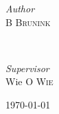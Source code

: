 \documentclass[11pt]{book}
\begin{document}
\begin{titlepage}

        \begin{minipage}{0.4\textwidth}
            \begin{flushleft}
                \large
                \textit{Author}\\
                B \textsc{Brunink} %
            \end{flushleft}
        \end{minipage}
        ~
        \begin{minipage}{0.4\textwidth}
            \begin{flushright}
                \large
                \textit{Supervisor}\\
                Wie \textsc{O Wie} %
            \end{flushright}
        \end{minipage}



        \vfill\vfill\vfill %

        {\large\today} %




        \vfill %

    \end{titlepage}

    \tableofcontents

    
    
\end{document}
